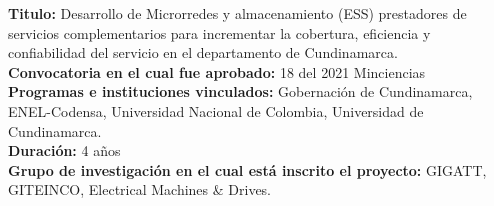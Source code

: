 \vspace*{0.05\baselineskip}
\textbf{Titulo:} Desarrollo de Microrredes y almacenamiento (ESS) prestadores de
servicios complementarios para incrementar la cobertura, eficiencia y confiabilidad del servicio en el departamento de Cundinamarca.\\
\noindent
\textbf{Convocatoria en el cual fue aprobado:} 18 del 2021 Minciencias\\
\textbf{Programas e instituciones vinculados:} Gobernación de Cundinamarca, ENEL-Codensa, Universidad Nacional de Colombia, Universidad de Cundinamarca.\\
\textbf{Duración:} 4 años\\
\textbf{Grupo de investigación en el cual está inscrito el proyecto:} GIGATT, GITEINCO, Electrical Machines \& Drives.